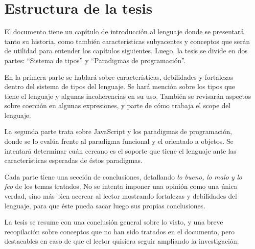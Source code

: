 
\section{Estructura de la tesis}

El documento tiene un capítulo de introducción al lenguaje donde se presentará tanto su historia, como también características subyacentes y conceptos que serán de utilidad para entender los capítulos siguientes. Luego, la tesis se divide en dos partes: "`Sistema de tipos"' y "`Paradigmas de programación"'. 

En la primera parte se hablará sobre características, debilidades y fortalezas dentro del sistema de tipos del lenguaje. Se hará mención sobre los tipos que tiene el lenguaje y algunas incoherencias en su uso. También se revisarán aspectos sobre coerción en algunas expresiones, y parte de cómo trabaja el scope del lenguaje.

La segunda parte trata sobre JavaScript y los paradigmas de programación, donde se lo evalúa frente al paradigma funcional y el orientado a objetos. Se intentará determinar cuán cercano es el soporte que tiene el lenguaje ante las características esperadas de éstos paradigmas.

Cada parte tiene una sección de conclusiones, detallando \textit{lo bueno, lo malo y lo feo} de los temas tratados. No se intenta imponer una opinión como una única verdad, sino más bien acercar al lector mostrando fortalezas y debilidades del lenguaje, para que éste pueda sacar luego sus propias conclusiones.

La tesis se resume con una conclusión general sobre lo visto, y una breve recopilación sobre conceptos que no han sido tratados en el documento, pero destacables en caso de que el lector quisiera seguir ampliando la investigación.